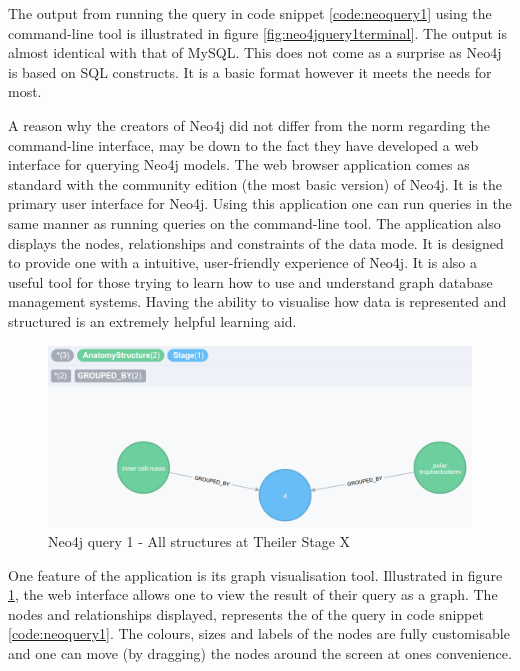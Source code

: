The output from running the query in code snippet \ref{code:neoquery1} using the command-line tool is illustrated in figure \ref{fig:neo4jquery1terminal}. The output is almost identical with that of MySQL. This does not come as a surprise as Neo4j is based on SQL constructs. It is a basic format however it meets the needs for most.

A reason why the creators of Neo4j did not differ from the norm regarding the command-line interface, may be down to the fact they have developed a web interface for querying Neo4j models. The web browser application comes as standard with the community edition (the most basic version) of Neo4j. It is the primary user interface for Neo4j. Using this application one can run queries in the same manner as running queries on the command-line tool. The application also displays the nodes, relationships and constraints of the data mode. It is designed to provide one with a intuitive, user-friendly experience of Neo4j. It is also a useful tool for those trying to learn how to use and understand graph database management systems. Having the ability to visualise how data is represented and structured is an extremely helpful learning aid.

\begin{figure}[H]\begin{center}\includegraphics[width=1\linewidth]{images/neo4jquery1graph}\caption{Neo4j query 1 - All structures at Theiler Stage X}\label{fig:neo4jquery1graph}\end{center}\end{figure}

One feature of the application is its graph visualisation tool. Illustrated in figure \ref{fig:neo4jquery1graph}, the web interface allows one to view the result of their query as a graph. The nodes and relationships displayed, represents the of the query in code snippet \ref{code:neoquery1}. The colours, sizes and labels of the nodes are fully customisable and one can move (by dragging) the nodes around the screen at ones convenience.

